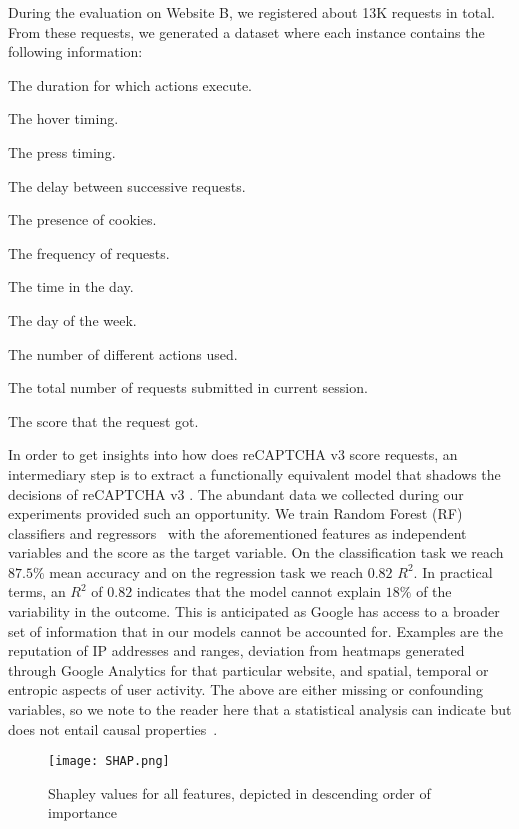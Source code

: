 During the evaluation on Website B, we registered about 13K requests in total.
From these requests, we generated a dataset where each instance contains the following information:
\begin{enumerate*}
    \item The duration for which actions execute.
    \item The hover timing.
    \item The press timing.
    \item The delay between successive requests.
    \item The presence of cookies.
    \item The frequency of requests.
    \item The time in the day.
    \item The day of the week.
    \item The number of different actions used.
    \item The total number of requests submitted in current session.
    \item The score that the request got.
\end{enumerate*}

In order to get insights into how does reCAPTCHA v3 score requests, an intermediary step is to extract a functionally equivalent model that shadows the decisions of reCAPTCHA v3 \cite{jagielski2020high, bastani2017interpreting}.
The abundant data we collected during our experiments provided such an opportunity.
We train Random Forest (\gls{RF}) classifiers and regressors~\cite{liaw2002classification} with the aforementioned features as independent variables and the score as the target variable.
On the classification task we reach $87.5\%$ mean accuracy and on the regression task we reach $0.82$ $R^2$.
In practical terms, an $R^2$ of $0.82$ indicates that the model cannot explain $18\%$ of the variability in the outcome.
This is anticipated as Google has access to a broader set of information that in our models cannot be accounted for.
Examples are the reputation of IP addresses and ranges, deviation from heatmaps generated through Google Analytics for that particular website, and spatial, temporal or entropic aspects of user activity.
The above are either missing or confounding variables, so we note to the reader here that a statistical analysis can indicate but does not entail causal properties~\cite{scholkopf2019causality}.

\begin{figure}[b]
\centerline{\texttt{[image: SHAP.png]}}
\caption{Shapley values for all features, depicted in descending order of importance}
\label{shap}
\end{figure}

